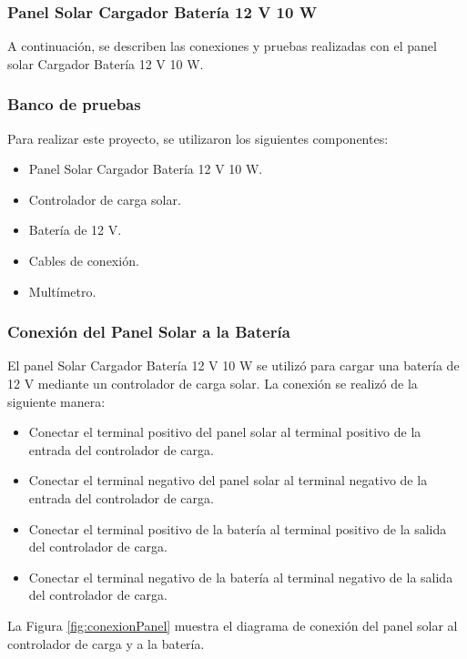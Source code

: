 \subsubsection{Panel Solar Cargador Batería 12 V 10 W}
A continuación, se describen las conexiones y pruebas realizadas con el panel solar Cargador Batería 12 V 10 W.

\subsubsection{Banco de pruebas}
Para realizar este proyecto, se utilizaron los siguientes componentes:
\begin{itemize}
    \item Panel  Solar Cargador Batería 12 V 10 W.
    \item Controlador de carga solar.
    \item Batería de 12 V.
    \item Cables de conexión.
    \item Multímetro.
\end{itemize}

\subsubsection{Conexión del Panel Solar a la Batería}
El panel Solar Cargador Batería 12 V 10 W se utilizó para cargar una batería de 12 V mediante un controlador de carga solar. La conexión se realizó de la siguiente manera:

\begin{itemize}
    \item Conectar el terminal positivo del panel solar al terminal positivo de la entrada del controlador de carga.
    \item Conectar el terminal negativo del panel solar al terminal negativo de la entrada del controlador de carga.
    \item Conectar el terminal positivo de la batería al terminal positivo de la salida del controlador de carga.
    \item Conectar el terminal negativo de la batería al terminal negativo de la salida del controlador de carga.
\end{itemize}

La Figura \ref{fig:conexionPanel} muestra el diagrama de conexión del panel solar al controlador de carga y a la batería.


